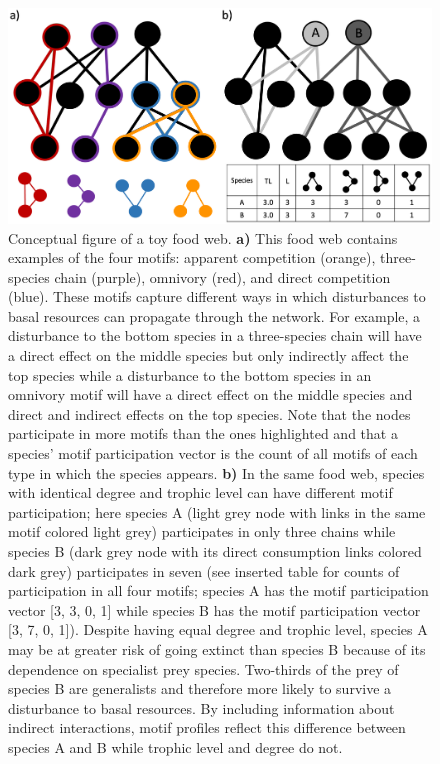 \documentclass[12pt]{article}
\begin{document}
\begin{spacing}{2.0}
        \begin{figure}[hb!]
        \centering
        \includegraphics[width=.9\textwidth]{figures/Figure_1.eps}
        \caption{Conceptual figure of a toy food web. \textbf{a)} This food web contains examples of the four motifs: apparent competition (orange), three-species chain (purple), omnivory (red), and direct competition (blue). These motifs capture different ways in which disturbances to basal resources can propagate through the network. For example, a disturbance to the bottom species in a three-species chain will have a direct effect on the middle species but only indirectly affect the top species while a disturbance to the bottom species in an omnivory motif will have a direct effect on the middle species and direct and indirect effects on the top species. 
        Note that the nodes participate in more motifs than the ones highlighted and that a species' motif participation vector is the count of all motifs of each type in which the species appears. \textbf{b)} In the same food web, species with identical degree and trophic level can have different motif participation; here species A (light grey node with links in the same motif colored light grey) participates in only three chains while species B (dark grey node with its direct consumption links colored dark grey) participates in seven (see inserted table for counts of participation in all four motifs; species A has the motif participation vector [3, 3, 0, 1] while species B has the motif participation vector [3, 7, 0, 1]).
        Despite having equal degree and trophic level, species A may be at greater risk of going extinct than species B because of its dependence on specialist prey species. Two-thirds of the prey of species B are generalists and therefore more likely to survive a disturbance to basal resources. By including information about indirect interactions, motif profiles reflect this difference between species A and B while trophic level and degree do not.}
    \label{fig:concept}
    \end{figure}



\end{spacing}
\end{document}
